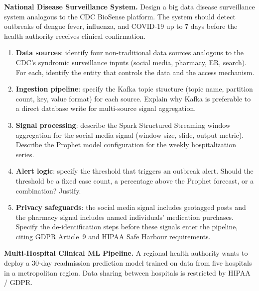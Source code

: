 
\dpr \textbf{National Disease Surveillance System.}
Design a big data disease surveillance system analogous to the CDC
BioSense platform. The system should detect outbreaks of dengue fever,
influenza, and COVID-19 up to 7 days before the health authority
receives clinical confirmation.

\begin{enumerate}[label=(\alph*)]
  \item \textbf{Data sources}: identify four non-traditional data sources
        analogous to the CDC's syndromic surveillance inputs (social
        media, pharmacy, ER, search). For each, identify the entity that
        controls the data and the access mechanism.
  \item \textbf{Ingestion pipeline}: specify the Kafka topic structure
        (topic name, partition count, key, value format) for each source.
        Explain why Kafka is preferable to a direct database write for
        multi-source signal aggregation.
  \item \textbf{Signal processing}: describe the Spark Structured Streaming
        window aggregation for the social media signal (window size, slide,
        output metric). Describe the Prophet model configuration for the
        weekly hospitalization series.
  \item \textbf{Alert logic}: specify the threshold that triggers an
        outbreak alert. Should the threshold be a fixed case count, a
        percentage above the Prophet forecast, or a combination? Justify.
  \item \textbf{Privacy safeguards}: the social media signal includes
        geotagged posts and the pharmacy signal includes named individuals'
        medication purchases. Specify the de-identification steps before
        these signals enter the pipeline, citing GDPR Article~9 and
        HIPAA Safe Harbour requirements.
\end{enumerate}

\dpr \textbf{Multi-Hospital Clinical ML Pipeline.}
A regional health authority wants to deploy a 30-day readmission
prediction model trained on data from five hospitals in a metropolitan
region. Data sharing between hospitals is restricted by HIPAA / GDPR.

